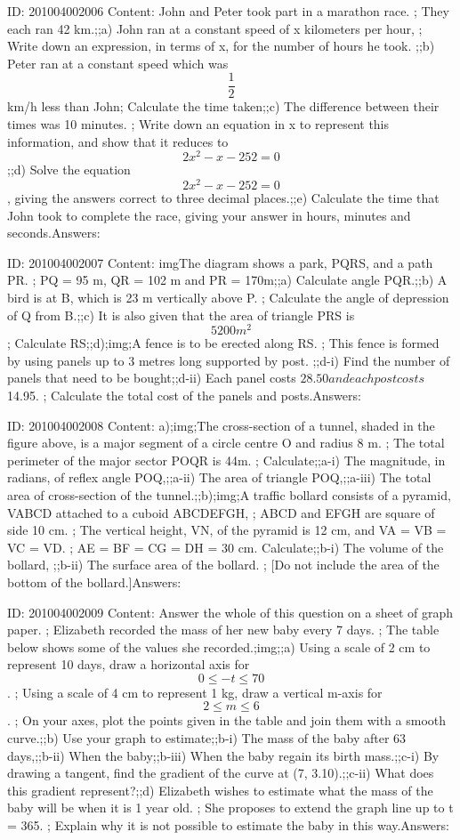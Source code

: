 \documentclass{article}
\begin{document}
ID: 201004002006
Content:
John and Peter took part in a marathon race. ; They each ran 42 km.;;a) John ran at a constant speed of x kilometers per hour, ; Write down an expression, in terms of x, for the number of hours he took. ;;b) Peter ran at a constant speed which was $$\frac{1}{2}$$ km/h less than John; Calculate the time taken;;c) The difference between their times was 10 minutes. ; Write down an equation in x to represent this information, and show that it reduces to $$2x^2 - x - 252 = 0$$;;d) Solve the equation $$2x^2 - x - 252 = 0$$, giving the answers correct to three decimal places.;;e) Calculate the time that John took to complete the race, giving your answer in hours, minutes and seconds.Answers:

ID: 201004002007
Content:
imgThe diagram shows a park, PQRS, and a path PR. ; PQ = 95 m, QR = 102 m and PR = 170m;;a) Calculate angle PQR.;;b) A bird is at B, which is 23 m vertically above P. ; Calculate the angle of depression of Q from B.;;c) It is also given that the area of triangle PRS is $$5200 m^2$$; Calculate RS;;d);img;A fence is to be erected along RS. ; This fence is formed by using panels up to 3 metres long supported by post. ;;d-i) Find the number of panels that need to be bought;;d-ii) Each panel costs $28.50 and each post costs $14.95. ; Calculate the total cost of the panels and posts.Answers:

ID: 201004002008
Content:
a);img;The cross-section of a tunnel, shaded in the figure above, is a major segment of a circle centre O and radius 8 m. ; The total perimeter of the major sector POQR is 44m. ; Calculate;;a-i) The magnitude, in radians, of reflex angle POQ,;;a-ii) The area of triangle POQ,;;a-iii) The total area of cross-section of the tunnel.;;b);img;A traffic bollard consists of a pyramid, VABCD attached to a cuboid ABCDEFGH, ; ABCD and EFGH are square of side 10 cm. ; The vertical height, VN, of the pyramid is 12 cm, and VA = VB = VC = VD. ; AE = BF = CG = DH = 30 cm. Calculate;;b-i) The volume of the bollard, ;;b-ii) The surface area of the bollard. ; [Do not include the area of the bottom of the bollard.]Answers:

ID: 201004002009
Content:
Answer the whole of this question on a sheet of graph paper. ; Elizabeth recorded the mass of her new baby every 7 days. ; The table below shows some of the values she recorded.;img;;a) Using a scale of 2 cm to represent 10 days, draw a horizontal axis for $$0 \leq -t \leq 70$$. ; Using a scale of 4 cm to represent 1 kg, draw a vertical m-axis for $$2 \leq m \leq 6$$. ; On your axes, plot the points given in the table and join them with a smooth curve.;;b) Use your graph to estimate;;b-i) The mass of the baby after 63 days,;;b-ii) When the baby;;b-iii) When the baby regain its birth mass.;;c-i) By drawing a tangent, find the gradient of the curve at (7, 3.10).;;c-ii) What does this gradient represent?;;d) Elizabeth wishes to estimate what the mass of the baby will be when it is 1 year old. ; She proposes to extend the graph line up to t = 365. ; Explain why it is not possible to estimate the baby in this way.Answers:
\end{document}
